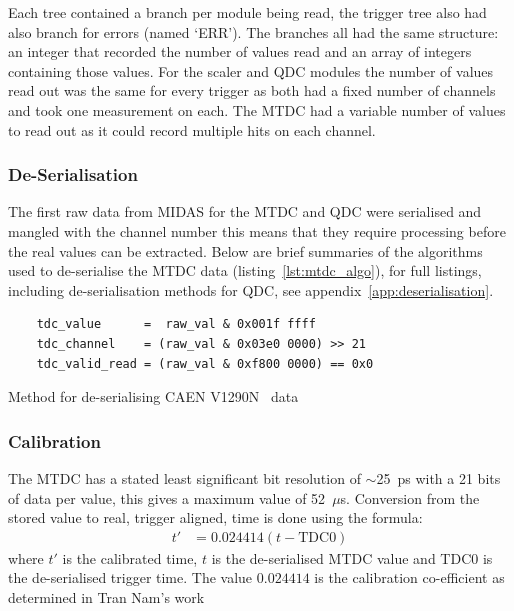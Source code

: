Each tree contained a branch per module being read, the trigger tree also had also branch for errors (named `ERR'). The branches all had the same structure: an integer that recorded the number of values read and an array of integers containing those values. For the scaler and QDC modules the number of values read out was the same for every trigger as both had a fixed number of channels and took one measurement on each. The MTDC had a variable number of values to read out as it could record multiple hits on each channel.
\subsubsection{De-Serialisation} %
\label{sub:de_serialisation}
The first raw data from MIDAS for the MTDC and QDC were serialised and mangled with the channel number this means that they require processing before the real values can be extracted. Below are brief summaries of the algorithms used to de-serialise the MTDC data (listing~\ref{lst:mtdc_algo}), for full listings, including de-serialisation methods for QDC, see appendix~\ref{app:deserialisation}.
%
\begin{listing}[htbp]
    \begin{verbatim}
    tdc_value      =  raw_val & 0x001f ffff
    tdc_channel    = (raw_val & 0x03e0 0000) >> 21
    tdc_valid_read = (raw_val & 0xf800 0000) == 0x0
    \end{verbatim}
    \caption{Method for de-serialising CAEN V1290N~\cite{CAENV1290N} data}
    \label{lst:mtdc_algo}
\end{listing}
\subsubsection{Calibration} %
\label{sub:calibration}
The MTDC has a stated least significant bit resolution of \(\sim\)25~ps with a 21 bits of data per value, this gives a maximum value of 52~\(\mu\)s. Conversion from the stored value to real, trigger aligned, time is done using the formula:
\begin{align}\label{equ:tdc_calibration}
    t'   &= 0.024414(t - \text{TDC}0)
\end{align}
where $t'$ is the calibrated time, $t$ is the de-serialised MTDC value and TDC$0$ is the de-serialised trigger time. The value $0.024414$ is the calibration co-efficient as determined in Tran Nam's work~\cite{timecalibNam2012}

